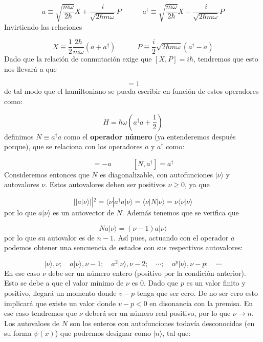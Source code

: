 \documentclass[12pt]{book}
\numberwithin{equation}{chapter}
\numberwithin{figure}{chapter}
\newcommand{\tquad}{\quad \quad \quad}
\newcommand{\parentesis}[1]{\left( #1  \right)}
\begin{document}
\begin{equation}
a \equiv \sqrt{\frac{m \omega}{2 \hbar}} X + \frac{i}{\sqrt{2 \hbar m \omega}} P \tquad 
a^\dagger \equiv \sqrt{\frac{m \omega}{2 \hbar}} X - \frac{i}{\sqrt{2 \hbar m \omega}} P 
\end{equation}
Invirtiendo las relaciones

\begin{equation}
X \equiv \frac{1}{2} \frac{2 \hbar}{m \omega} \parentesis{a+a^\dagger}  \tquad P \equiv  \frac{i}{2} \sqrt{2 \hbar m \omega} \parentesis{a^\dagger-a} 
\end{equation}
Dado que la relación de conmutación exige que $[X,P]=i \hbar$, tendremos que esto nos llevará a que

\begin{equation}
[a,a^\dagger]=1
\end{equation}
de tal modo que el hamiltoniano se pueda escribir en función de estos operadores como:

\begin{equation}
H = \hbar \omega \parentesis{a^\dagger a + \frac{1}{2}}
\end{equation}
definimos $N\equiv a^\dagger a$ como el \textbf{operador número} (ya entenderemos después porque), que se relaciona con los operadores $a$ y $a^\dagger$ como:

\begin{equation}
[N,a] = -a \tquad [N,a^\dagger] = a^{\dagger}
\end{equation}
Consideremos entonces que $N$ es diagonalizable, con autofunciones $|\nu\rangle$ y autovalores $\nu$. Estos autovalores deben ser positivos $\nu \geq 0$, ya que

\begin{equation}
|| a |\nu\rangle ||^2 = \langle \nu | a^\dagger a | \nu \rangle = \langle \nu | N  | \nu \rangle = \nu \langle \nu | \nu \rangle
\end{equation}
por lo que $a|\nu\rangle$ es un autovector de $N$. Además tenemos que se verifica que

\begin{equation}
N a |\nu \rangle = (\nu -1) a |\nu \rangle
\end{equation}
por lo que su autovalor es de $n-1$. Así pues, actuando con el operador $a$ podemos obtener una sencuencia de estados con sus respectivos autovalores:

\begin{equation}
|\nu\rangle,\nu; \quad  a |\nu\rangle, \nu-1; \quad a^2|\nu\rangle, \nu-2; \quad \cdots;  \quad a^p |\nu \rangle, \nu-p; \quad \cdots
\end{equation}
En ese caso $\nu$ debe ser un número entero (positivo por la condición anterior). Esto se debe a que el valor mínimo de $\nu$ es 0. Dado que $p$ es un valor finito y positivo, llegará un momento donde $v-p$ tenga que ser cero. De no ser cero esto implicará que existe un valor donde $v-p<0$ en disonancia con la premisa. En ese caso tendremos que $\nu$ deberá ser un número real positivo, por lo que $\nu\rightarrow n$. Los autovaloes de $N$ son los enteros con autofunciones todavía desconocidas  (en su forma $\psi(x)$) que podremos designar como $|n\rangle$, tal que:
\end{document}
